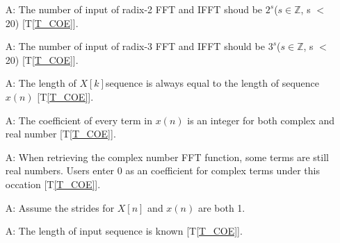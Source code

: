 \documentclass[12pt]{article}
\newcommand{\tref}[1]{T\ref{#1}}
\newcounter{assumpnum} %
\begin{document}
\begin{itemize}

\item[A\refstepcounter{assumpnum}\theassumpnum \label{A_meaningfulLabel}:]
The number of  input of radix-2 FFT and IFFT shoud be $2^s$($s\in\mathbb{Z}$, s $<$ 20) [\tref{T_COE}].
\item[A\refstepcounter{assumpnum}\theassumpnum \label{A_meaningfulLabel}:]
The number of input of radix-3 FFT and IFFT should be $3^s$($s\in\mathbb{Z}$, s $<$ 20) [\tref{T_COE}].
\item[A\refstepcounter{assumpnum}\theassumpnum \label{A_meaningfulLabel}:]
The length of $X[k] $sequence is always equal to the length of sequence $x(n)$  [\tref{T_COE}].
\item[A\refstepcounter{assumpnum}\theassumpnum \label{A_meaningfulLabel}:]
The coefficient of every term in $x(n)$ is an integer for both complex and real number  [\tref{T_COE}].
\item[A\refstepcounter{assumpnum}\theassumpnum \label{A_meaningfulLabel}:]
When retrieving the complex number FFT function, some terms are still real numbers. Users enter 0 as an coefficient for complex terms under this occation [\tref{T_COE}].
\item[A\refstepcounter{assumpnum}\theassumpnum \label{A_meaningfulLabel}:]
Assume the strides for ${X}[n]$ and ${x}(n)$ are both 1.
\item[A\refstepcounter{assumpnum}\theassumpnum \label{A_meaningfulLabel}:]
The length of input sequence is known [\tref{T_COE}].


\end{itemize}
\end{document}
